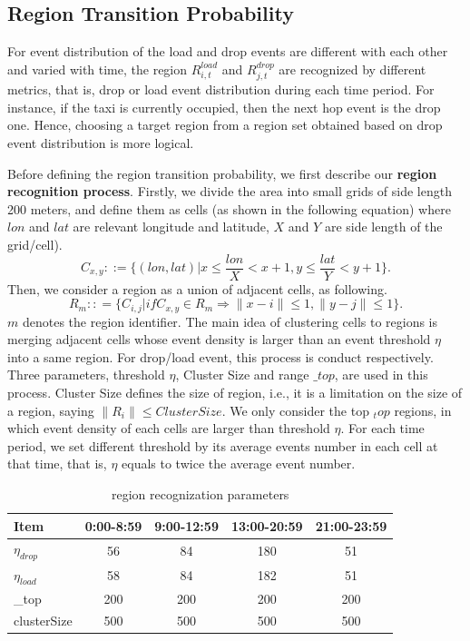 \subsection{Region Transition Probability}
For event distribution of the load and drop events are different with each other and varied with time, the region $R_{i,t}^{load}$ and $R_{j,t}^{drop}$ are recognized by different metrics, that is, drop or load event distribution during  each time period. For instance, if the taxi is currently occupied, then the next hop event is the drop one. Hence, choosing a target region from a region set obtained based on drop event distribution is more logical. 

Before defining the region transition probability, we first describe our \textbf{region recognition process}.
Firstly, we divide the area into small grids of side length 200 meters, and define them as cells (as shown in the following equation) where $lon$ and $lat$ are relevant longitude and latitude, $X$ and $Y$ are side length of the grid/cell).
\[C_{x,y}::=\{(lon,lat)|x \le \frac{{lon}}{{X}} < x + 1,
y \le \frac{{lat}}{{Y}} < y + 1\}.\]
Then, we consider a region as a union of adjacent cells, as following.
\[R_m:: = \{ C_{i,j}|if C_{x,y} \in R_m
\Rightarrow \|x - i\| \le 1,\|y - j\| \le 1\}.\]
$m$ denotes the region identifier.
The main idea of clustering cells to regions is merging adjacent cells whose event density is larger than an event threshold $\eta$ into a same region.
For drop/load event, this process is conduct respectively. 
Three parameters, threshold $\eta$, Cluster Size and range $\_top$, are used in this process. 
Cluster Size defines the size of region, i.e., it is a limitation on the size of a region, saying $\|R_i\|\leq ClusterSize$.
We only consider the top $_top$ regions, in which event density of each cells are larger than threshold $\eta$.
For each time period,  we set different threshold by its average events number in each cell at that time, that is, $\eta$ equals to twice the average event number.

\begin{table}
\caption{region recognization parameters}
\centering
\begin{tabular}{l|c|c|c|c}
  \hline
  Item & 0:00-8:59 &9:00-12:59&13:00-20:59 &21:00-23:59 \\
  \hline
  $\eta_{drop}$ & 56&84 &180 &51\\
  $\eta_{load}$ & 58&84 &182 &51\\
  \_top & 200&200 &200 &200\\
  clusterSize& 500&500 &500 &500\\
  \hline
\end{tabular}
\end{table}

